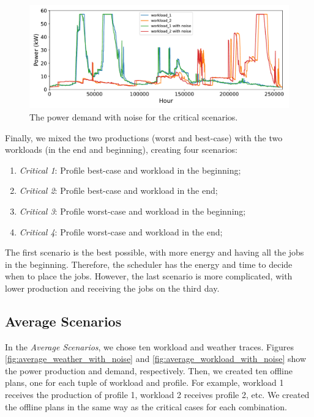 \begin{figure}[!htb]
    \centering
    \includegraphics[scale=0.58]{Images/Compensations/critical_jobs_arriving_with_noise.pdf}
    \caption{The power demand with noise for the critical scenarios.}
    \label{fig:critical_workload_with_noise}
\end{figure}

Finally, we mixed the two productions (worst and best-case) with the two workloads (in the end and beginning), creating four scenarios:

\begin{enumerate}
    \item \emph{Critical 1}: Profile best-case and workload in the beginning;
    \item \emph{Critical 2}: Profile best-case and workload in the end;
    \item \emph{Critical 3}: Profile worst-case and workload in the beginning;
    \item \emph{Critical 4}: Profile worst-case and workload in the end;
\end{enumerate}

The first scenario is the best possible, with more energy and having all the jobs in the beginning. Therefore, the scheduler has the energy and time to decide when to place the jobs. However, the last scenario is more complicated, with lower production and receiving the jobs on the third day.

\subsection{Average Scenarios}

In the \emph{Average Scenarios}, we chose ten workload and weather traces. Figures \ref{fig:average_weather_with_noise} and \ref{fig:average_workload_with_noise} show the power production and demand, respectively. Then, we created ten offline plans, one for each tuple of workload and profile. For example, workload 1 receives the production of profile 1, workload 2 receives profile 2, etc. We created the offline plans in the same way as the critical cases for each combination.

